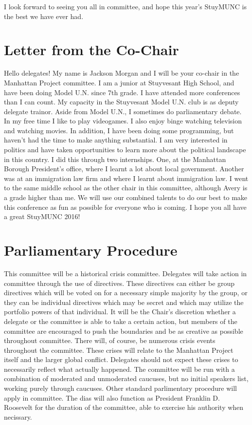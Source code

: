 \documentclass[11 pt, twoside]{article}
\begin{document}
I look forward to seeing you all in committee, and hope this year's StuyMUNC is the best we have ever had.

\section{Letter from the Co-Chair}
	Hello delegates! My name is Jackson Morgan and I will be your co-chair in the Manhattan Project committee. I am a junior at Stuyvesant High School, and have been doing Model U.N. since 7th grade. I have attended more conferences than I can count. My capacity in the Stuyvesant Model U.N. club is as deputy delegate trainor. Aside from Model U.N., I sometimes do parliamentary debate. In my free time I like to play videogames. I also enjoy binge watching television and watching movies. In addition, I have been doing some programming, but haven’t had the time to make anything substantial.
	I am very interested in politics and have taken opportunities to learn more about the political landscape in this country. I did this through two internships. One, at the Manhattan Borough President’s office, where I learnt a lot about local government. Another was at an immigration law firm and where I learnt about immigration law. 	
	I went to the same middle school as the other chair in this committee, although Avery is a grade higher than me. We will use our combined talents to do our best to make this conference as fun as possible for everyone who is coming. I hope you all have a great StuyMUNC 2016!

\section{Parliamentary Procedure}
	This committee will be a historical crisis committee. Delegates will take action in committee through the use of directives. These directives can either be group directives which will be voted on for a necessary simple majority by the group, or they can be individual directives which may be secret and which may utilize the portfolio powers of that individual. It will be the Chair’s discretion whether a delegate or the committee is able to take a certain action, but members of the committee are encouraged to push the boundaries and be as creative as possible throughout committee. There will, of course, be numerous crisis events throughout the committee. These crises will relate to the Manhattan Project itself and the larger global conflict. Delegates should not expect these crises to necessarily reflect what actually happened. The committee will be run with a combination of moderated and unmoderated caucuses, but no initial speakers list, working purely through caucuses. Other standard parlimentary procedure will apply in committee. The dias will also function as President Franklin D. Roosevelt for the duration of the committee, able to exercise his authority when necissary.
\end{document}
